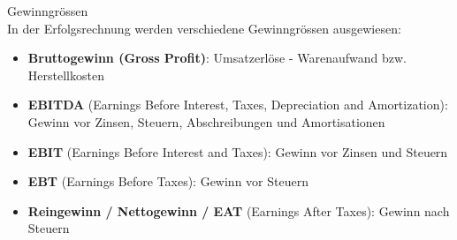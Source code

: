 \begin{definition}{Gewinngrössen}\\
In der Erfolgsrechnung werden verschiedene Gewinngrössen ausgewiesen:
\begin{itemize}
    \item \textbf{Bruttogewinn (Gross Profit)}: Umsatzerlöse - Warenaufwand bzw. Herstellkosten
    \item \textbf{EBITDA} (Earnings Before Interest, Taxes, Depreciation and Amortization): Gewinn vor Zinsen, Steuern, Abschreibungen und Amortisationen
    \item \textbf{EBIT} (Earnings Before Interest and Taxes): Gewinn vor Zinsen und Steuern
    \item \textbf{EBT} (Earnings Before Taxes): Gewinn vor Steuern
    \item \textbf{Reingewinn / Nettogewinn / EAT} (Earnings After Taxes): Gewinn nach Steuern
\end{itemize}
\end{definition}

